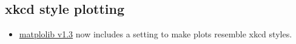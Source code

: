 \documentclass{article}
\begin{document}
    \begin{center}
    \end{center}
    { \hspace*{\fill} \\}
    
    \subsection{xkcd style plotting}

\begin{itemize}
\itemsep1pt\parskip0pt
\item
  \href{http://matplotlib.org/xkcd/examples/showcase/xkcd.html}{matplolib
  v1.3} now includes a setting to make plots resemble xkcd styles.
\end{itemize}
\end{document}
